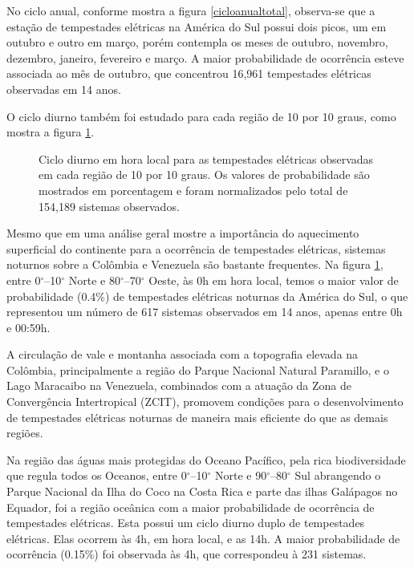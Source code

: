No ciclo anual, conforme mostra a figura \ref{cicloanualtotal}, observa-se que a estação de tempestades elétricas na América do Sul possui dois picos, um em outubro e outro em março, porém contempla os meses de outubro, novembro, dezembro, janeiro, fevereiro e março. A maior probabilidade de ocorrência esteve associada ao mês de outubro, que concentrou 16,961 tempestades elétricas observadas em 14 anos. %


O ciclo diurno também foi estudado para cada região de 10 por 10 graus, como mostra a figura \ref{diurno}. 



\begin{figure}[!hb]
\caption{Ciclo diurno em hora local para as tempestades elétricas observadas em cada região de 10 por 10 graus. Os valores de probabilidade são mostrados em porcentagem e foram normalizados pelo total de 154,189 sistemas observados.}
\label{diurno}
\end{figure}


Mesmo que em uma análise geral mostre a importância do aquecimento superficial do continente para a ocorrência de tempestades elétricas, sistemas noturnos sobre a Colômbia e Venezuela são bastante frequentes. Na figura \ref{diurno}, entre 0$^{\circ}$--10$^{\circ}$ Norte e 80$^{\circ}$--70$^{\circ}$ Oeste, às 0h em hora local, temos o maior valor de probabilidade (0.4\%) de tempestades elétricas noturnas da América do Sul, o que representou um número de 617 sistemas observados em 14 anos, apenas entre 0h e 00:59h.


A circulação de vale e montanha associada com a topografia elevada na Colômbia, principalmente a região do Parque Nacional Natural Paramillo, e o Lago Maracaibo na Venezuela, combinados com a atuação da Zona de Convergência Intertropical (ZCIT), promovem condições para o desenvolvimento de tempestades elétricas noturnas de maneira mais eficiente do que as demais regiões. 

  
Na região das águas mais protegidas do Oceano Pacífico, pela rica biodiversidade que regula todos os Oceanos, entre 0$^{\circ}$--10$^{\circ}$ Norte e 90$^{\circ}$--80$^{\circ}$ Sul abrangendo o Parque Nacional da Ilha do Coco na Costa Rica e parte das ilhas Galápagos no Equador, foi a região oceânica com a maior probabilidade de ocorrência de tempestades elétricas. Esta possui um ciclo diurno duplo de tempestades elétricas. Elas ocorrem às 4h, em hora local, e as 14h. A maior probabilidade de ocorrência (0.15\%) foi observada às 4h, que correspondeu à 231 sistemas.

